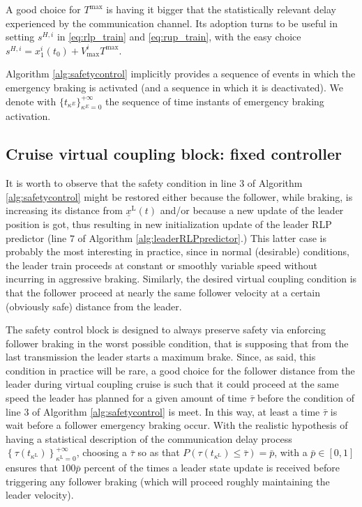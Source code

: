 \documentclass[letterpaper, 10 pt, conference]{ieeeconf}
\theoremstyle{definition}
\theoremstyle{nopoint}
\begin{document}
A good choice for $T^{\max}$ is having it bigger that the statistically relevant delay experienced by the communication channel.
Its adoption turns to be useful in setting $s^{H,i}$ in \eqref{eq:rlp_train} and \eqref{eq:rup_train}, with the easy choice $s^{H,i}=x_1^i(t_0)+V^i_{\max} T^{\max}$.

Algorithm \ref{alg:safetycontrol} implicitly provides a sequence of events in which the emergency braking is activated (and a sequence in which it is deactivated). We denote with 
$\{ t_{\kappa^E} \}_{\kappa^E =0}^{+\infty}$ the sequence of time instants of emergency braking activation. 









 
\subsection{Cruise virtual coupling block: fixed controller}
 \label{subsec:vitrualcouplingblock} 
 
It is worth to observe that the safety condition in line $3$ of  Algorithm \ref{alg:safetycontrol} might be restored either because the follower, while braking, is increasing its distance from $\underline{x}^\mathrm{L}(t)$ and/or because a new update of the leader position is got, thus resulting in new initialization update of the leader RLP predictor (line $7$ of Algorithm \ref{alg:leaderRLPpredictor}.)
This latter case is probably the most interesting in practice, since in normal (desirable) conditions, the leader train proceeds at constant or smoothly variable speed without incurring in aggressive braking. Similarly, the desired virtual coupling condition is that the follower proceed at nearly the same follower velocity at a certain (obviously safe) distance from the leader. 


The safety control block is designed to always preserve safety via enforcing follower braking in the worst possible condition, that is supposing that from the last transmission the leader starts a maximum brake. Since, as said, this condition in practice will be rare, a good choice for the follower distance from the leader during virtual coupling cruise is such that it could proceed at the same speed the leader has planned for a given amount of time $\bar{\tau}$ before the condition of line  $3$ of  Algorithm \ref{alg:safetycontrol} is meet. In this way, at least a time $\bar{\tau}$ is wait before a follower emergency braking occur. 
With the realistic hypothesis of having a statistical description of the communication delay process $ \left\{ \tau(t_{\kappa^\mathrm{L}})\right\}_{\kappa^\mathrm{L}=0}^{+\infty}$, 
choosing a $\bar{\tau}$ so as that  $P( \tau(t_{\kappa^\mathrm{L}})\leq \bar{\tau})=\bar{p}$, with a $\bar{p}\in [0,1]$ ensures that $100 \bar{p}$ percent of the times a leader state update is received before triggering any follower braking (which will proceed roughly maintaining the leader velocity).
 
\end{document}

